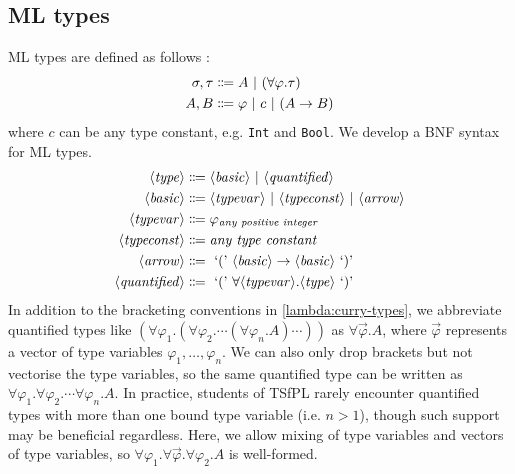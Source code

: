 \subsection{\textsc{ML} types}
\textsc{ML} types are defined as follows \cite{van-bakel:2022}:
\begin{align*}
    \sigma, \tau &\Coloneqq A \ |\  (\forall \varphi. \tau) \\
    A, B &\Coloneqq \varphi \ |\  c \ |\  (A \rightarrow B)
\end{align*}
where $c$ can be any type constant, e.g. \texttt{Int} and \texttt{Bool}. We develop a BNF syntax for \textsc{ML} types.
\begin{align*}
    \langle\mathit{type}\rangle &\Coloneqq \langle\mathit{basic}\rangle \ |\  \langle\mathit{quantified}\rangle \\
    \langle\mathit{basic}\rangle &\Coloneqq \langle\mathit{typevar}\rangle \ |\  \langle\mathit{typeconst}\rangle \ |\  \langle\mathit{arrow}\rangle \\
    \langle\mathit{typevar}\rangle &\Coloneqq \varphi_{\textit{any positive integer}} \\
    \langle\mathit{typeconst}\rangle &\Coloneqq \textit{any type constant} \\
    \langle\mathit{arrow}\rangle &\Coloneqq \text{ `(' } \langle\mathit{basic}\rangle \rightarrow \langle\mathit{basic}\rangle \text{ `)' } \\
    \langle\mathit{quantified}\rangle &\Coloneqq \text{ `(' } \forall \langle\mathit{typevar}\rangle. \langle\mathit{type}\rangle \text{ `)' }
\end{align*}
In addition to the bracketing conventions in \ref{lambda:curry-types}, we abbreviate quantified types like $(\forall \varphi_1. (\forall \varphi_2. \cdots (\forall \varphi_n. A) \cdots ))$ as $\forall \Vec{\varphi}. A$, where $\Vec{\varphi}$ represents a vector of type variables $\varphi_1, \ldots, \varphi_n$. We can also only drop brackets but not vectorise the type variables, so the same quantified type can be written as $\forall \varphi_1. \forall \varphi_2. \cdots \forall \varphi_n. A$. In practice, students of TSfPL rarely encounter quantified types with more than one bound type variable (i.e. $n > 1$), though such support may be beneficial regardless. Here, we allow mixing of type variables and vectors of type variables, so $\forall \varphi_1. \forall \Vec{\varphi}. \forall \varphi_2. A$ is well-formed.


